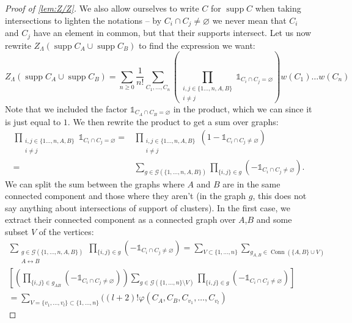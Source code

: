 \documentclass{article}
\DeclareMathOperator{\Conn}{Conn}
\DeclareMathOperator{\supp}{supp}
\begin{document}
 \begin{proof}[Proof of \cref{lem:Z/Z}]
     We also allow ourselves to write $C$ for $\supp C$ when taking intersections to lighten the notations -- by $C_i\cap C_j \neq \varnothing$ we never mean that $C_i$ and $C_j$ have an element in common, but that their supports intersect.
     Let us now rewrite $Z_\Lambda(\supp C_A\cup \supp C_B)$ to find the expression we want:
     \begin{equation}
         \label{eqn:ZCACB_with_product}
         Z_\Lambda(\supp C_A\cup \supp C_B)=\sum_{n\geq 0}\frac 1{n!}\sum_{C_1,\ldots,C_n}\left(\prod_{\substack{i,j\in \{1\ldots,n,A,B\}\\
                 i\neq j}}\mathbb 1_{C_i\cap C_j=\varnothing}\right)w(C_1)\ldots w(C_n)
     \end{equation}
     Note that we included the factor $\mathbb 1_{C_A\cap C_B=\varnothing}$ in the product, which we can since it is just equal to $1$.
     We then rewrite the product to get a sum over graphs:
     \begin{align*}
         \prod_{\substack{i,j\in \{1\ldots,n,A,B\}\\
                 i\neq j}}\mathbb 1_{C_i\cap C_j=\varnothing}=&\prod_{\substack{i,j\in \{1\ldots,n,A,B\}\\
                 i\neq j}}(1-\mathbb 1_{C_i\cap C_j\neq\varnothing})\\
         =&\sum_{g \in \mathcal G(\{1,\ldots,n,A,B\})}\prod_{\{i,j\}\in g}(-\mathbb 1_{C_i\cap C_j\neq \varnothing}).
     \end{align*}
     We can split the sum between the graphs where $A$ and $B$ are in the same connected component and those where they aren’t (in the graph $g$, this does not say anything about intersections of support of clusters).
     In the first case, we extract their connected component as a connected graph over $A$,$B$ and some subset $V$ of the vertices:
     \begin{multline*}
         \sum_{\substack{g \in\mathcal G (\{1,\ldots,n,A,B\})\\A\leftrightarrow B}}\prod_{\{i,j\}\in g}(-\mathbb 1_{C_i\cap C_j\neq\varnothing})=\sum_{V\subset \{1,\ldots,n\}}\sum_{g_{A,B}\in\Conn(\{A,B\}\cup V)}\\\left[ \left(\prod_{\{i,j\}\in g_{AB}}(-\mathbb 1_{C_i\cap C_j\neq \varnothing})\right)
         \sum_{g\in \mathcal G(\{1,\ldots,n\}\setminus V)}\prod_{\{i,j\}\in g}(-\mathbb 1_{C_i\cap C_j\neq\varnothing})\right]\\
         =\sum_{V=\{v_1,\ldots,v_l\}\subset\{1,\ldots,n\}}\Biggl((l+2)!\varphi(C_A,C_B,C_{v_1},\ldots,C_{v_l})

\end{multline*}
\end{proof}
\end{document}

